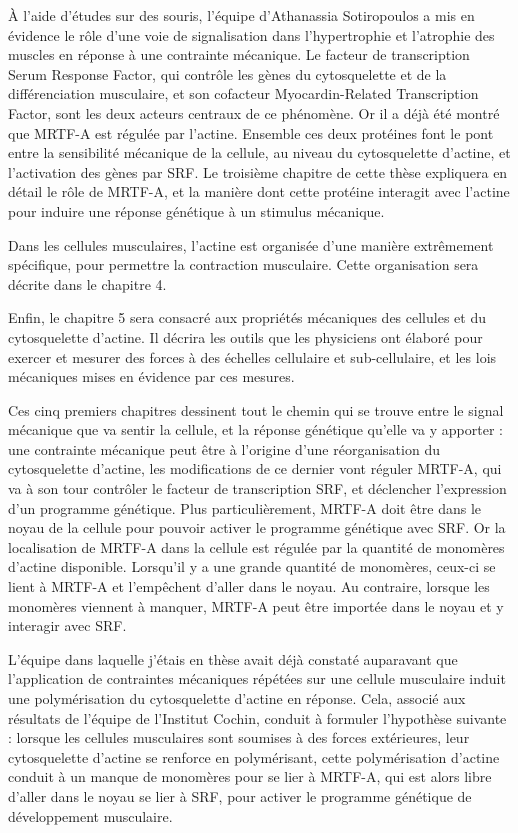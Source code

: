 \documentclass[10pt,twoside]{report}
\begin{document}
  À l'aide d'études sur des souris, l'équipe d'Athanassia Sotiropoulos a mis en évidence le rôle d'une voie de signalisation dans l'hypertrophie et l'atrophie des muscles en réponse à une contrainte mécanique. Le facteur de transcription Serum Response Factor, qui contrôle les gènes du cytosquelette et de la différenciation musculaire, et son cofacteur Myocardin-Related Transcription Factor, sont les deux acteurs centraux de ce phénomène. Or il a déjà été montré que MRTF-A est régulée par l'actine. Ensemble ces deux protéines font le pont entre la sensibilité mécanique de la cellule, au niveau du cytosquelette d'actine, et l'activation des gènes par SRF. Le troisième chapitre de cette thèse expliquera en détail le rôle de MRTF-A, et la manière dont cette protéine interagit avec l'actine pour induire une réponse génétique à un stimulus mécanique. 
  
  Dans les cellules musculaires, l'actine est organisée d'une manière extrêmement spécifique, pour permettre la contraction musculaire. Cette organisation sera décrite dans le chapitre 4. 
  
  Enfin, le chapitre 5 sera consacré aux propriétés mécaniques des cellules et du cytosquelette d'actine. Il décrira les outils que les physiciens ont élaboré pour exercer et mesurer des forces à des échelles cellulaire et sub-cellulaire, et les lois mécaniques mises en évidence par ces mesures. 
  
  Ces cinq premiers chapitres dessinent tout le chemin qui se trouve entre le signal mécanique que va sentir la cellule, et la réponse génétique qu'elle va y apporter : une contrainte mécanique peut être à l'origine d'une réorganisation du cytosquelette d'actine, les modifications de ce dernier vont réguler MRTF-A, qui va à son tour contrôler le facteur de transcription SRF, et déclencher l'expression d'un programme génétique. Plus particulièrement, MRTF-A doit être dans le noyau de la cellule pour pouvoir activer le programme génétique avec SRF. Or la localisation de MRTF-A dans la cellule est régulée par la quantité de monomères d'actine disponible. Lorsqu'il y a une grande quantité de monomères, ceux-ci se lient à MRTF-A et l'empêchent d'aller dans le noyau. Au contraire, lorsque les monomères viennent à manquer, MRTF-A peut être importée dans le noyau et y interagir avec SRF. 
  
  L'équipe dans laquelle j'étais en thèse avait déjà constaté auparavant que l'application de contraintes mécaniques répétées sur une cellule musculaire induit une polymérisation du cytosquelette d'actine en réponse. Cela, associé aux résultats de l'équipe de l'Institut Cochin, conduit à formuler l'hypothèse suivante : lorsque les cellules musculaires sont soumises à des forces extérieures, leur cytosquelette d'actine se renforce en polymérisant, cette polymérisation d'actine conduit à un manque de monomères pour se lier à MRTF-A, qui est alors libre d'aller dans le noyau se lier à SRF, pour activer le programme génétique de développement musculaire. 
  
\end{document}
